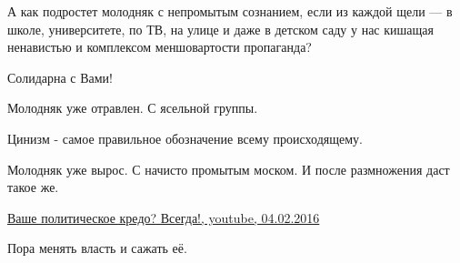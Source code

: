 \begin{itemize}
А как подростет молодняк с непромытым сознанием, если из каждой щели — в школе, университете, по ТВ, на улице и даже в детском саду у нас кишащая ненавистью и комплексом меншовартости пропаганда?

 
Солидарна с Вами!

 
Молодняк уже отравлен. С ясельной группы.

 
Цинизм - самое правильное обозначение всему происходящему.

 
Молодняк уже вырос. С начисто промытым моском. И после размножения даст такое же.

 
\href{https://youtu.be/ykn5mN1_4pY}{%
Ваше политическое кредо? Всегда!, youtube, 04.02.2016%
}

 
Пора менять власть и сажать её.


\end{itemize}
